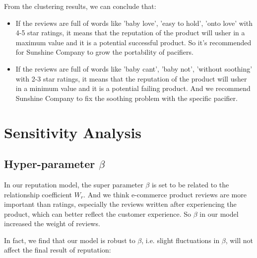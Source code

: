 \documentclass{mcmthesis}
\begin{document}
From the clustering results, we can conclude that:
\begin{itemize}
	\item If the reviews are full of words like 'baby love', 'easy to hold', 'onto love' with 4-5 star ratings, it means that the reputation of the product will usher in a maximum value and it is a potential successful product. So it's recommended for Sunshine Company to grow the portability of pacifiers.
	\item If the reviews are full of words like 'baby cant', 'baby not', 'without soothing' with 2-3 star ratings, it means that the reputation of the product will usher in a minimum value and it is a potential failing product. And we recommend Sunshine Company to fix the soothing problem with the specific pacifier.
\end{itemize}

\section{Sensitivity Analysis}
\subsection{Hyper-parameter $\beta$}
In our reputation model, the super parameter $\beta$ is set to be related to the relationship coefficient $W_{r}$. And we think e-commerce product reviews are more important than ratings\cite{zhang2006lord}, especially the reviews written after experiencing the product, which can better reflect the customer experience. So $\beta$ in our model increased the weight of reviews.

In fact, we find that our model is robust to $\beta$, i.e. slight fluctuations in $\beta$, will not affect the final result of reputation:
\end{document}
